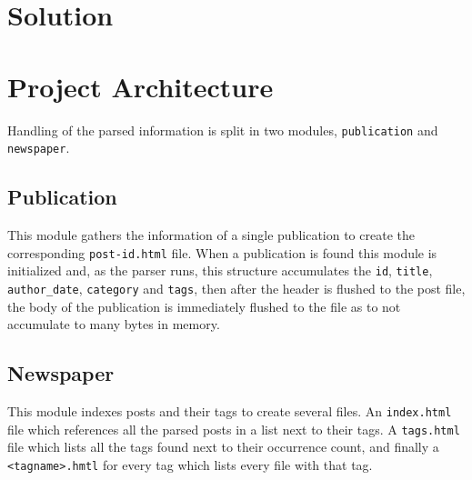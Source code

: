 \documentclass[a4paper]{article}
\begin{document}
\section{Solution}

\section{Project Architecture}

Handling of the parsed information is split in two modules, \texttt{publication} and \texttt{newspaper}.

\subsection{Publication}

This module gathers the information of a single publication to create the
corresponding \texttt{post-id.html} file. When a publication is found this
module is initialized and, as the parser runs, this structure accumulates the
\texttt{id}, \texttt{title}, \texttt{author\_date}, \texttt{category} and
\texttt{tags}, then after the header is flushed to the post file, the body of
the publication is immediately flushed to the file as to not accumulate to many
bytes in memory.

\subsection{Newspaper}

This module indexes posts and their tags to create several files. An
\texttt{index.html} file which references all the parsed posts in a list next
to their tags. A \texttt{tags.html} file which lists all the tags found next to
their occurrence count, and finally a \texttt{<tagname>.hmtl} for every tag
which lists every file with that tag.
\end{document}
